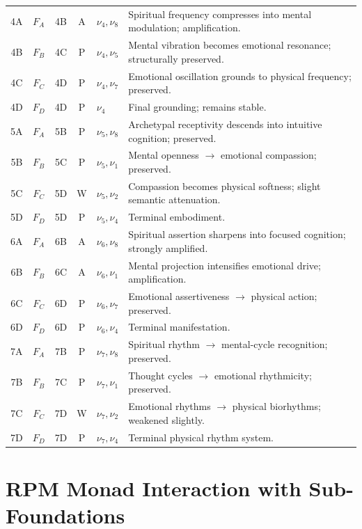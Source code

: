 \begin{longtable}{c|c|c|c|p{1.5cm}|p{4.5cm}}
4A & $F_A$ & 4B & A &
$\nu_4,\nu_8$ &
Spiritual frequency compresses into mental modulation; amplification.
\\
4B & $F_B$ & 4C & P &
$\nu_4,\nu_5$ &
Mental vibration becomes emotional resonance; structurally preserved.
\\
4C & $F_C$ & 4D & P &
$\nu_4,\nu_7$ &
Emotional oscillation grounds to physical frequency; preserved.
\\
4D & $F_D$ & 4D & P &
$\nu_4$ &
Final grounding; remains stable.
\\
\midrule

5A & $F_A$ & 5B & P &
$\nu_5,\nu_8$ &
Archetypal receptivity descends into intuitive cognition; preserved.
\\
5B & $F_B$ & 5C & P &
$\nu_5,\nu_1$ &
Mental openness $\to$ emotional compassion; preserved.
\\
5C & $F_C$ & 5D & W &
$\nu_5,\nu_2$ &
Compassion becomes physical softness; slight semantic attenuation.
\\
5D & $F_D$ & 5D & P &
$\nu_5,\nu_4$ &
Terminal embodiment.
\\
\midrule

6A & $F_A$ & 6B & A &
$\nu_6,\nu_8$ &
Spiritual assertion sharpens into focused cognition; strongly amplified.
\\
6B & $F_B$ & 6C & A &
$\nu_6,\nu_1$ &
Mental projection intensifies emotional drive; amplification.
\\
6C & $F_C$ & 6D & P &
$\nu_6,\nu_7$ &
Emotional assertiveness $\to$ physical action; preserved.
\\
6D & $F_D$ & 6D & P &
$\nu_6,\nu_4$ &
Terminal manifestation.
\\
\midrule

7A & $F_A$ & 7B & P &
$\nu_7,\nu_8$ &
Spiritual rhythm $\to$ mental-cycle recognition; preserved.
\\
7B & $F_B$ & 7C & P &
$\nu_7,\nu_1$ &
Thought cycles $\to$ emotional rhythmicity; preserved.
\\
7C & $F_C$ & 7D & W &
$\nu_7,\nu_2$ &
Emotional rhythms $\to$ physical biorhythms; weakened slightly.
\\
7D & $F_D$ & 7D & P &
$\nu_7,\nu_4$ &
Terminal physical rhythm system.
\\

\end{longtable}
\normalsize

\section{RPM Monad Interaction with Sub-Foundations}

